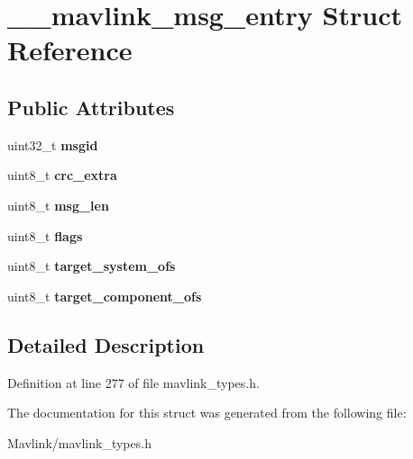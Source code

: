 \hypertarget{struct____mavlink__msg__entry}{}\section{\+\_\+\+\_\+mavlink\+\_\+msg\+\_\+entry Struct Reference}
\label{struct____mavlink__msg__entry}
\subsection*{Public Attributes}
\begin{DoxyCompactItemize}
\item 
\hypertarget{struct____mavlink__msg__entry_a9febab81ee60dbd1a91a23a5515cad31}{}\label{struct____mavlink__msg__entry_a9febab81ee60dbd1a91a23a5515cad31} 
uint32\+\_\+t {\bfseries msgid}
\item 
\hypertarget{struct____mavlink__msg__entry_ab85eed6dcef2052cffb9093b4e2fb026}{}\label{struct____mavlink__msg__entry_ab85eed6dcef2052cffb9093b4e2fb026} 
uint8\+\_\+t {\bfseries crc\+\_\+extra}
\item 
\hypertarget{struct____mavlink__msg__entry_a694a59ebf8db1111bdc87ae20e19e57d}{}\label{struct____mavlink__msg__entry_a694a59ebf8db1111bdc87ae20e19e57d} 
uint8\+\_\+t {\bfseries msg\+\_\+len}
\item 
\hypertarget{struct____mavlink__msg__entry_a5dd6c81b1631f802139252c6032f0bf3}{}\label{struct____mavlink__msg__entry_a5dd6c81b1631f802139252c6032f0bf3} 
uint8\+\_\+t {\bfseries flags}
\item 
\hypertarget{struct____mavlink__msg__entry_a4c94154ed0764d8084d67270b1142dfa}{}\label{struct____mavlink__msg__entry_a4c94154ed0764d8084d67270b1142dfa} 
uint8\+\_\+t {\bfseries target\+\_\+system\+\_\+ofs}
\item 
\hypertarget{struct____mavlink__msg__entry_a08d68ae337d99e053f02cb248a8d41b8}{}\label{struct____mavlink__msg__entry_a08d68ae337d99e053f02cb248a8d41b8} 
uint8\+\_\+t {\bfseries target\+\_\+component\+\_\+ofs}
\end{DoxyCompactItemize}


\subsection{Detailed Description}


Definition at line 277 of file mavlink\+\_\+types.\+h.



The documentation for this struct was generated from the following file\+:\begin{DoxyCompactItemize}
\item 
Mavlink/mavlink\+\_\+types.\+h\end{DoxyCompactItemize}
